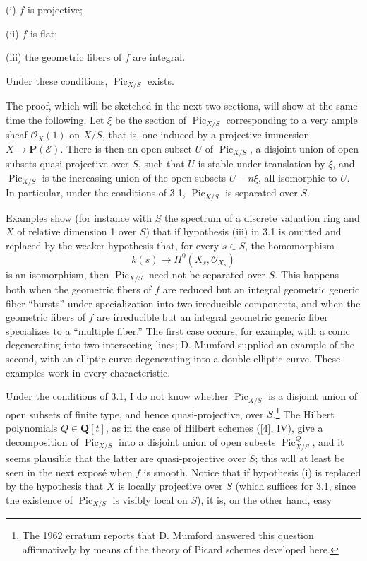 \noindent (i) $f$ is projective;

\noindent (ii) $f$ is flat;

\noindent (iii) the geometric fibers of $f$ are integral.

Under these conditions, $\operatorname{Pic}_{X/S}$ exists.

The proof, which will be sketched in the next two sections, will show at the
same time the following. Let $\xi$ be the section of
$\operatorname{Pic}_{X/S}$ corresponding to a very ample sheaf
$\mathcal O_X(1)$ on $X/S$, that is, one induced by a projective immersion
$X\longrightarrow\mathbf P(\mathcal E)$. There is then an open subset $U$ of
$\operatorname{Pic}_{X/S}$, a disjoint union of open subsets quasi-projective
over $S$, such that $U$ is stable under translation by $\xi$, and
$\operatorname{Pic}_{X/S}$ is the increasing union of the open subsets
$U-n\xi$, all isomorphic to $U$. In particular, under the conditions of 3.1,
$\operatorname{Pic}_{X/S}$ is separated over $S$.

 Examples show (for instance with $S$ the spectrum of a
discrete valuation ring and $X$ of relative dimension 1 over $S$) that if
hypothesis (iii) in 3.1 is omitted and replaced by the weaker hypothesis that,
for every $s\in S$, the homomorphism
\[
k(s)\longrightarrow H^0(X_s,\mathcal O_{X_s})
\]
is an isomorphism, then $\operatorname{Pic}_{X/S}$ need not be separated over
$S$. This happens both when the geometric fibers of $f$ are reduced but an
integral geometric generic fiber “bursts” under specialization into two
irreducible components, and when the geometric fibers of $f$ are irreducible
but an integral geometric generic fiber specializes to a “multiple fiber.”
The first case occurs, for example, with a conic degenerating into two
intersecting lines; D. Mumford supplied an example of the second, with an
elliptic curve degenerating into a double elliptic curve. These examples work
in every characteristic.

 Under the conditions of 3.1, I do not know whether
$\operatorname{Pic}_{X/S}$ is a disjoint union of open subsets of finite type,
and hence quasi-projective, over $S$.\footnote{The 1962 erratum reports that
D. Mumford answered this question affirmatively by means of the theory of
Picard schemes developed here.} The Hilbert polynomials
$Q\in\mathbf Q[t]$, as in the case of Hilbert schemes ([4], IV), give a
decomposition of $\operatorname{Pic}_{X/S}$ into a disjoint union of open
subsets $\operatorname{Pic}^{Q}_{X/S}$, and it seems plausible that the latter
are quasi-projective over $S$; this will at least be seen in the next exposé
when $f$ is smooth. Notice that if hypothesis (i) is replaced by the hypothesis
that $X$ is locally projective over $S$ (which suffices for 3.1, since the
existence of $\operatorname{Pic}_{X/S}$ is visibly local on $S$), it is, on the
other hand, easy

